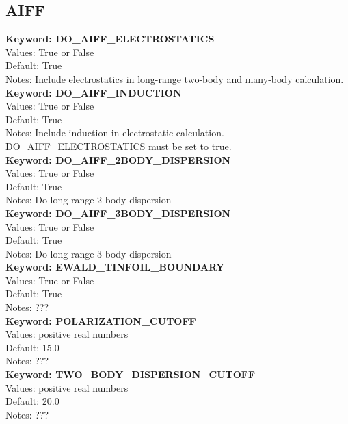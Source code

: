 \documentclass[11pt,letterpaper]{article}
\begin{document}
\begin{spacing}{1.0}
\subsection{AIFF}

\noindent
\textbf{Keyword: DO\_AIFF\_ELECTROSTATICS} \\
Values:  True or False\\
Default: True\\
Notes:   Include electrostatics in long-range two-body and many-body
         calculation.\\

\noindent
\textbf{Keyword: DO\_AIFF\_INDUCTION } \\
Values:  True or False\\
Default: True\\
Notes:   Include induction in electrostatic calculation.\\
         DO\_AIFF\_ELECTROSTATICS must be set to true.\\

\noindent
\textbf{Keyword: DO\_AIFF\_2BODY\_DISPERSION } \\
Values:  True or False\\
Default: True\\
Notes:   Do long-range 2-body dispersion \\

\noindent
\textbf{Keyword: DO\_AIFF\_3BODY\_DISPERSION } \\
Values:  True or False\\
Default: True\\
Notes:   Do long-range 3-body dispersion \\

\noindent
\textbf{Keyword: EWALD\_TINFOIL\_BOUNDARY} \\
Values:  True or False\\
Default: True\\
Notes:  ???\\

\noindent
\textbf{Keyword: POLARIZATION\_CUTOFF} \\
Values:  positive real numbers\\
Default: 15.0\\
Notes:  ???\\

\noindent
\textbf{Keyword: TWO\_BODY\_DISPERSION\_CUTOFF} \\
Values: positive real numbers\\
Default: 20.0\\
Notes:  ???\\


\end{spacing}
\end{document}
